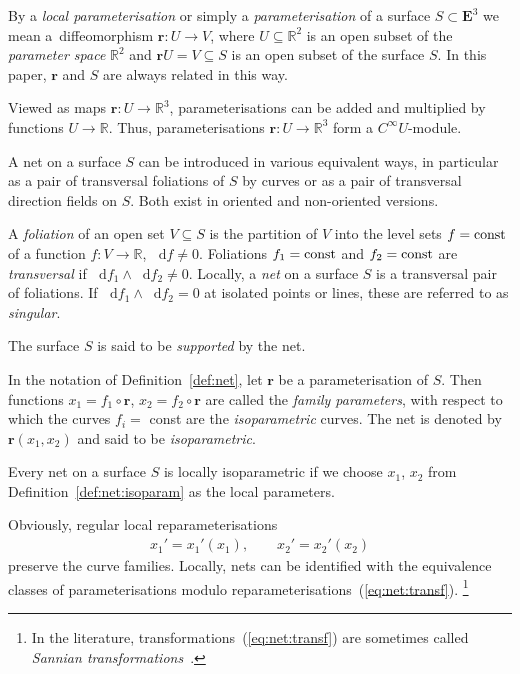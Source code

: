 \documentclass[pdftex]{sigma}
\let\ve\mathbf
\def\eqref#1{{\rm(\ref{#1})}}
\numberwithin{equation}{section}
\def\dif{\mathop{}\!\mathrm d}
\begin{document}
By a {\it local parameterisation} or simply a {\it parameterisation} of a surface
$S \subset \ve E^3$ we mean a~diffeomorphism $\ve r \colon  U \to V$,
where $U \subseteq \mathbb R^2$ is an open subset of the
{\it parameter space} $\mathbb R^2$ and
$\ve r U = V \subseteq S$
is an open subset of the surface $S$.
In this paper, $\ve r$ and $S$ are always related in this way.

Viewed as maps $\ve r \colon  U \to \mathbb R^3$, parameterisations can be added and
multiplied by functions $U \to \mathbb R$.
Thus, parameterisations $\ve r \colon  U \to \mathbb R^3$ form a $C^\infty U$-module.

A net on a surface $S$ can be introduced in various equivalent ways,
in particular as a pair of transversal foliations of $S$ by curves or as a pair of
transversal direction fields on $S$.
Both exist in oriented and non-oriented versions.

\begin{Definition} \label{def:net}
A {\it foliation} of an open set $V \subseteq S$ is the partition of $V$ into the
level sets ${f = {\rm const}}$ of a function $f \colon  V \to \mathbb R$, $\dif f \ne 0$.
Foliations $f_1 = {\rm const}$ and $f_2 = {\rm const}$ are {\it transversal}
if $\dif f_1 \wedge \dif f_2 \ne 0$.
Locally, a {\it net\/} on a surface $S$ is a transversal pair of foliations.
If $\dif f_1 \wedge \dif f_2 = 0$ at isolated points or lines, these are referred to as
{\it singular}.
\end{Definition}

The surface $S$ is said to be {\it supported} by the net.

\begin{Definition} \label{def:net:isoparam}
In the notation of Definition~\ref{def:net},
let $\ve r$ be a parameterisation of $S$.
Then functions $x_1 = f_1 \circ\ve r$, $x_2 = f_2 \circ\ve r$  are called the
{\it family parameters}, with respect to which
the curves $f_i =$ const are the {\it isoparametric} curves.
The net is denoted by $\ve r(x_1,x_2)$ and said to be {\it isoparametric}.
\end{Definition}

Every net on a surface $S$ is locally isoparametric if we choose $x_1$, $x_2$ from
Definition~\ref{def:net:isoparam} as the local parameters.

Obviously, regular local reparameterisations
\begin{align}\label{eq:net:transf}
x_1' = x_1'(x_1), \qquad x_2' = x_2'(x_2)
\end{align}
preserve the curve families.
Locally, nets can be identified with the equivalence classes of
parameterisations modulo reparameterisations~\eqref{eq:net:transf}.%
\footnote{In the literature, transformations~\eqref{eq:net:transf} are sometimes
called {\it Sannian transformations}~\cite{YaSD, GS}.}
\end{document}
